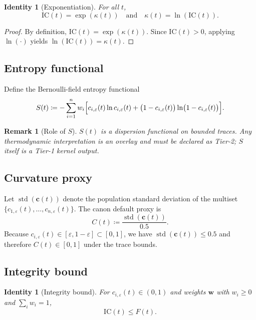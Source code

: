\documentclass[
  aps,
  prd,
  preprint,
  superscriptaddress,
  nofootinbib,
  floatfix
]{revtex4-2}
\DeclareMathOperator{\std}{std}
\newcommand{\IC}{\mathrm{IC}}
\newtheorem{identity}[theorem]{Identity}
\newtheorem{remark}{Remark}
\begin{document}
\begin{identity}[Exponentiation]
\label{id:exponentiation}
For all $t$,
\begin{equation}
  \IC(t)=\exp(\kappa(t))
  \quad\text{and}\quad
  \kappa(t)=\ln(\IC(t)).
\end{equation}
\end{identity}

\begin{proof}
By definition, $\IC(t)=\exp(\kappa(t))$. Since $\IC(t)>0$, applying $\ln(\cdot)$ yields $\ln(\IC(t))=\kappa(t)$.
\end{proof}

\subsection{Entropy functional}
Define the Bernoulli-field entropy functional
\begin{equation}
  S(t) \coloneqq -\sum_{i=1}^n w_i\Bigl[
    c_{i,\varepsilon}(t)\ln c_{i,\varepsilon}(t)
    + \bigl(1-c_{i,\varepsilon}(t)\bigr)\ln\bigl(1-c_{i,\varepsilon}(t)\bigr)
  \Bigr].
\end{equation}

\begin{remark}[Role of $S$]
$S(t)$ is a dispersion functional on bounded traces. Any thermodynamic interpretation is an overlay and must be declared
as Tier-2; $S$ itself is a Tier-1 kernel output.
\end{remark}

\subsection{Curvature proxy}
Let $\std(\bm{c}(t))$ denote the population standard deviation of the multiset
$\{c_{1,\varepsilon}(t),\dots,c_{n,\varepsilon}(t)\}$. The canon default proxy is
\begin{equation}
  C(t) \coloneqq \frac{\std(\bm{c}(t))}{0.5}.
\end{equation}
Because $c_{i,\varepsilon}(t)\in[\varepsilon,1-\varepsilon]\subset[0,1]$, we have $\std(\bm{c}(t))\le 0.5$ and therefore
$C(t)\in[0,1]$ under the trace bounds.

\subsection{Integrity bound}
\begin{identity}[Integrity bound]
\label{id:integrity_bound}
For $c_{i,\varepsilon}(t)\in(0,1)$ and weights $\bm{w}$ with $w_i\ge 0$ and $\sum_i w_i=1$,
\begin{equation}
  \IC(t)\le F(t).
\end{equation}
\end{identity}
\end{document}
